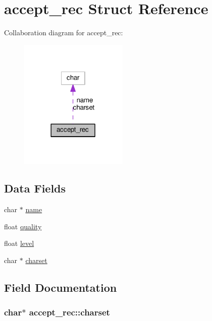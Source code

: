 \hypertarget{structaccept__rec}{}\section{accept\+\_\+rec Struct Reference}
\label{structaccept__rec}


Collaboration diagram for accept\+\_\+rec\+:
\nopagebreak
\begin{figure}[H]
\begin{center}
\leavevmode
\includegraphics[width=146pt]{structaccept__rec__coll__graph}
\end{center}
\end{figure}
\subsection*{Data Fields}
\begin{DoxyCompactItemize}
\item 
char $\ast$ \hyperlink{structaccept__rec_acb7fffb4ab6a09a7972302c15b258edb}{name}
\item 
float \hyperlink{structaccept__rec_a97dcff520f7eecb7f1a75b694d6d9d2e}{quality}
\item 
float \hyperlink{structaccept__rec_a89e2d463155fd8770057981e002664f9}{level}
\item 
char $\ast$ \hyperlink{structaccept__rec_a5ccb83c40879fa57d6b41f2107f23700}{charset}
\end{DoxyCompactItemize}


\subsection{Field Documentation}
\subsubsection[{\texorpdfstring{charset}{charset}}]{\setlength{\rightskip}{0pt plus 5cm}char$\ast$ accept\+\_\+rec\+::charset}\hypertarget{structaccept__rec_a5ccb83c40879fa57d6b41f2107f23700}{}\label{structaccept__rec_a5ccb83c40879fa57d6b41f2107f23700}
